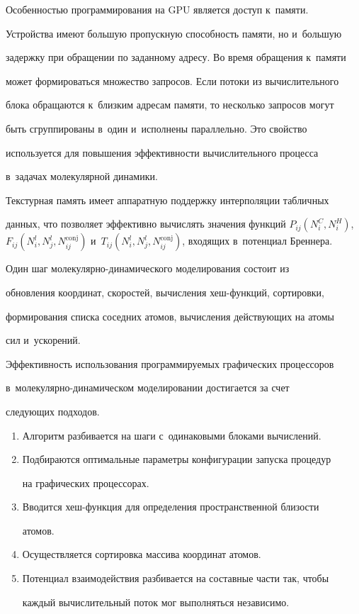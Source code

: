   

  Особенностью программирования на GPU является доступ к~памяти. 

Устройства имеют большую пропускную способность памяти, но и~большую 

задержку при обращении по заданному адресу. Во время обращения к~памяти 

может формироваться множество запросов. Если потоки из вычислительного 

блока обращаются к~близким адресам памяти, то несколько запросов могут 

быть сгруппированы в~один и~исполнены параллельно. Это свойство 

используется для повышения эффективности вычислительного процесса 

в~задачах молекулярной динамики.

  

  Текстурная память имеет аппаратную поддержку интерполяции табличных 

данных, что позволяет эффективно вычислять значения функций $P_{ij}(N_i^C, 

N_i^H)$, $F_{ij}(N_i^l, N_j^l, N_{ij}^{\mathrm{conj}})$ и~$T_{ij}(N_i^l, N_j^l, 

N_{ij}^{\mathrm{conj}})$,  входящих в~потенциал Бреннера.

  

  Один шаг молекулярно-динамического моделирования состоит из 

обновления координат, скоростей, вычисления хеш-функ\-ций, сортировки, 

формирования списка соседних атомов, вычисления действующих на атомы 

сил и~ускорений. 

  

  Эффективность использования программируемых графических процессоров 

в~мо\-ле\-ку\-ляр\-но-ди\-на\-ми\-че\-ском моделировании достигается за счет 

следующих подходов.

  \begin{enumerate}[1.]

\item Алгоритм разбивается на шаги с~одинаковыми блоками вычислений.

\item  Подбираются оптимальные параметры конфигурации запуска процедур 

на графических процессорах.

  \item  Вводится хеш-функция для определения пространственной близости 

атомов.

  \item Осуществляется сортировка массива координат атомов.

  \item Потенциал взаимодействия разбивается на составные части так, чтобы 

каж\-дый вычислительный поток мог выполняться независимо. 

  \end{enumerate}

